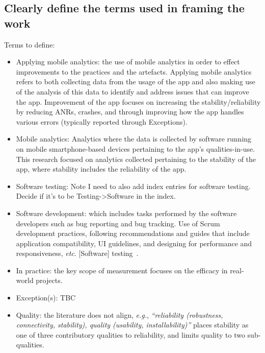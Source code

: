 \subsection{Clearly define the terms used in framing the work}
Terms to define:  
{\tiny
\begin{itemize}
    \item Applying mobile analytics: the use of mobile analytics in order to effect improvements to the practices and the artefacts. Applying mobile analytics refers to both collecting data from the usage of the app and also making use of the analysis of this data to identify and address issues that can improve the app. Improvement of the app focuses on increasing the stability/reliability by reducing ANRs, crashes, and through improving how the app handles various errors (typically reported through Exceptions).
    \item Mobile analytics: Analytics where the data is collected by software running on mobile smartphone-based devices pertaining to the app's qualities-in-use. This research focused on analytics collected pertaining to the stability of the app, where stability includes the reliability of the app.
    \item Software testing: Note I need to also add index entries for software testing. Decide if it's to be Testing->Software in the index.
    \item Software development: which includes tasks performed by the software developers such as bug reporting and bug tracking.  Use of Scrum development practices, following recommendations and guides that include application compatibility, UI guidelines, and designing for performance and responsiveness, \emph{etc}. [Software] testing~.~
    \item In practice: the key scope of measurement focuses on the efficacy in real-world projects.
    \item Exception(s): TBC
    \item Quality: the literature does not align, \emph{e.g.}, \emph{``reliability (robustness, connectivity, stability), quality (usability, installability)''}\cite[p.399]{wasserman2010_software_engineering_issues_for_mobile_app_devt} places stability as one of three contributory qualities to reliability, and limits quality to two sub-qualities.         
\end{itemize}
}


